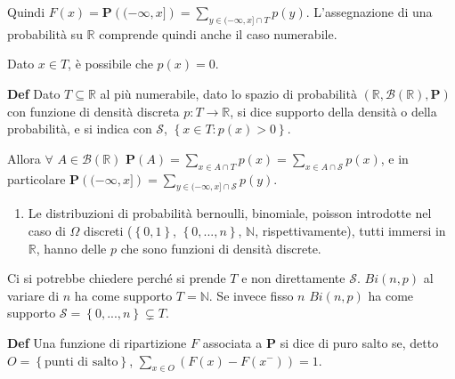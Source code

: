 \documentclass{article}
\begin{document}
Quindi $F\left( x\right) =\mathbf{P}\left( (-\infty ,x]\right) =\sum_{y\in
(-\infty ,x]\cap T}p\left( y\right) $. L'assegnazione di una probabilit\`{a}
su $%
\mathbb{R}
$ comprende quindi anche il caso numerabile.

Dato $x\in T$, \`{e} possibile che $p\left( x\right) =0$.

\textbf{Def} Dato $T\subseteq 
\mathbb{R}
$ al pi\`{u} numerabile, dato lo spazio di probabilit\`{a} $\left( 
\mathbb{R}
,\mathcal{B}\left( 
\mathbb{R}
\right) ,\mathbf{P}\right) $ con funzione di densit\`{a} discreta $%
p:T\rightarrow 
\mathbb{R}
$, si dice supporto della densit\`{a} o della probabilit\`{a}, e si indica
con $\mathcal{S}$, $\left\{ x\in T:p\left( x\right) >0\right\} $.

Allora $\forall $ $A\in \mathcal{B}\left( 
\mathbb{R}
\right) $ $\mathbf{P}\left( A\right) =\sum_{x\in A\cap T}p\left( x\right)
=\sum_{x\in A\cap \mathcal{S}}p\left( x\right) $, e in particolare $\mathbf{P%
}\left( (-\infty ,x]\right) =\sum_{y\in (-\infty ,x]\cap \mathcal{S}}p\left(
y\right) $.

\begin{enumerate}
\item Le distribuzioni di probabilit\`{a} bernoulli, binomiale, poisson
introdotte nel caso di $\Omega $ discreti ($\left\{ 0,1\right\} $, $\left\{
0,...,n\right\} $, $%
\mathbb{N}
$, rispettivamente), tutti immersi in $%
\mathbb{R}
$, hanno delle $p$ che sono funzioni di densit\`{a} discrete.
\end{enumerate}

Ci si potrebbe chiedere perch\'{e}
si prende $T$ e non direttamente $\mathcal{S}$. $Bi\left( n,p\right) $ al
variare di $n$ ha come supporto $T$$\mathcal{=%
\mathbb{N}
}$. Se invece fisso $n$ $Bi\left( n,p\right) $ ha come supporto $\mathcal{S=}%
\left\{ 0,...,n\right\} \varsubsetneq T$.

\textbf{Def} Una funzione di ripartizione $F$ associata a $\mathbf{P}$ si
dice di puro salto se, detto $O=\left\{ \text{punti di salto}\right\} $, $%
\sum_{x\in O}\left( F\left( x\right) -F\left( x^{-}\right) \right) =1$.
\end{document}
